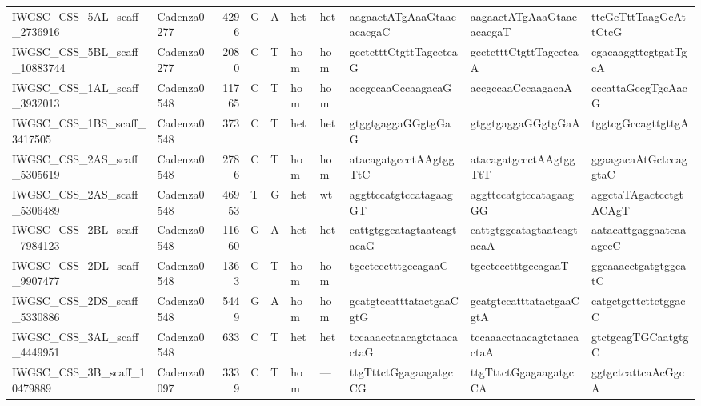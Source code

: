 \begin{tabular}{llrlllllll}
 IWGSC\_CSS\_5AL\_scaff\_2736916  & Cadenza0277 &       4296 & G         & A        & het            & het         & aagaactATgAaaGtaacacacgaC & aagaactATgAaaGtaacacacgaT & ttcGcTttTaagGcAttCtcG     \\
 IWGSC\_CSS\_5BL\_scaff\_10883744 & Cadenza0277 &       2080 & C         & T        & hom            & hom         & gcctctttCtgttTagcctcaG    & gcctctttCtgttTagcctcaA    & cgacaaggttcgtgatTgcA      \\
 IWGSC\_CSS\_1AL\_scaff\_3932013  & Cadenza0548 &      11765 & C         & T        & hom            & hom         & accgccaaCccaagacaG        & accgccaaCccaagacaA        & cccattaGccgTgcAacG        \\
 IWGSC\_CSS\_1BS\_scaff\_3417505  & Cadenza0548 &        373 & C         & T        & het            & het         & gtggtgaggaGGgtgGaG        & gtggtgaggaGGgtgGaA        & tggtcgGccagttgttgA        \\
 IWGSC\_CSS\_2AS\_scaff\_5305619  & Cadenza0548 &       2786 & C         & T        & hom            & hom         & atacagatgccctAAgtggTtC    & atacagatgccctAAgtggTtT    & ggaagacaAtGctccaggtaC     \\
 IWGSC\_CSS\_2AS\_scaff\_5306489  & Cadenza0548 &      46953 & T         & G        & het            & wt          & aggttccatgtccatagaagGT    & aggttccatgtccatagaagGG    & aggctaTAgactcctgtACAgT    \\
 IWGSC\_CSS\_2BL\_scaff\_7984123  & Cadenza0548 &      11660 & G         & A        & het            & het         & cattgtggcatagtaatcagtacaG & cattgtggcatagtaatcagtacaA & aatacattgaggaatcaaagccC   \\
 IWGSC\_CSS\_2DL\_scaff\_9907477  & Cadenza0548 &       1363 & C         & T        & hom            & hom         & tgcctccctttgccagaaC       & tgcctccctttgccagaaT       & ggcaaacctgatgtggcatC      \\
 IWGSC\_CSS\_2DS\_scaff\_5330886  & Cadenza0548 &       5449 & G         & A        & hom            & hom         & gcatgtccatttatactgaaCgtG  & gcatgtccatttatactgaaCgtA  & catgctgcttcttctggacC      \\
 IWGSC\_CSS\_3AL\_scaff\_4449951  & Cadenza0548 &        633 & C         & T        & het            & het         & tccaaacctaacagtctaacactaG & tccaaacctaacagtctaacactaA & gtctgcagTGCaatgtgC        \\
 IWGSC\_CSS\_3B\_scaff\_10479889  & Cadenza0097 &       3339 & C         & T        & hom            & ---         & ttgTttctGgagaagatgcCG     & ttgTttctGgagaagatgcCA     & ggtgctcattcaAcGgcA        \\

\end{tabular}
